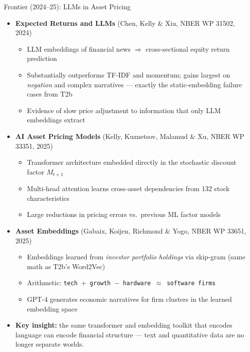 \begin{frame}{Frontier (2024--25): LLMs in Asset Pricing}
\begin{itemize}
\item \textbf{Expected Returns and LLMs} (Chen, Kelly \& Xiu, NBER WP 31502, 2024)
\begin{itemize}
    \item LLM embeddings of financial news $\Rightarrow$ cross-sectional equity return prediction
    \item Substantially outperforms TF-IDF and momentum; gains largest on \emph{negation} and complex narratives --- exactly the static-embedding failure cases from T2b
    \item Evidence of slow price adjustment to information that only LLM embeddings extract
\end{itemize}

\medskip
\item \textbf{AI Asset Pricing Models} (Kelly, Kuznetsov, Malamud \& Xu, NBER WP 33351, 2025)
\begin{itemize}
    \item Transformer architecture embedded directly in the stochastic discount factor $M_{t+1}$
    \item Multi-head attention learns cross-asset dependencies from 132 stock characteristics
    \item Large reductions in pricing errors vs.\ previous ML factor models
\end{itemize}

\medskip
\item \textbf{Asset Embeddings} (Gabaix, Koijen, Richmond \& Yogo, NBER WP 33651, 2025)
\begin{itemize}
    \item Embeddings learned from \emph{investor portfolio holdings} via skip-gram (same math as T2b's Word2Vec)
    \item Arithmetic: \texttt{tech $+$ growth $-$ hardware $\approx$ software firms}
    \item GPT-4 generates economic narratives for firm clusters in the learned embedding space
\end{itemize}

\medskip
\item \textbf{Key insight:} the same transformer and embedding toolkit that encodes language can encode financial structure --- text and quantitative data are no longer separate worlds.
\end{itemize}
\end{frame}

